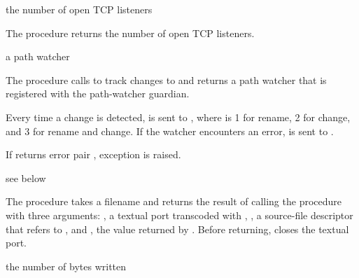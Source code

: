 \begin{procedure}
\end{procedure}
\returns{} the number of open TCP listeners

The  procedure returns the number of open TCP
listeners.

\begin{procedure}
\end{procedure}
\returns{} a path watcher

The  procedure calls  to track
changes to  and returns a path watcher that is registered
with the path-watcher guardian.

Every time a change is detected,  is sent to , where
 is 1 for rename, 2 for change, and 3 for rename and
change. If the watcher encounters an error,
 is sent to
.

If  returns error pair , exception  is raised.

\begin{procedure}
\end{procedure}
\returns{} see below

The  procedure takes a filename
 and returns the result of calling the procedure
 with three arguments: , a textual port
transcoded with , , a
source-file descriptor that refers to , and
, the value returned by .
Before returning,  closes the textual
port.

\begin{procedure}
\end{procedure}
\returns{} the number of bytes written

